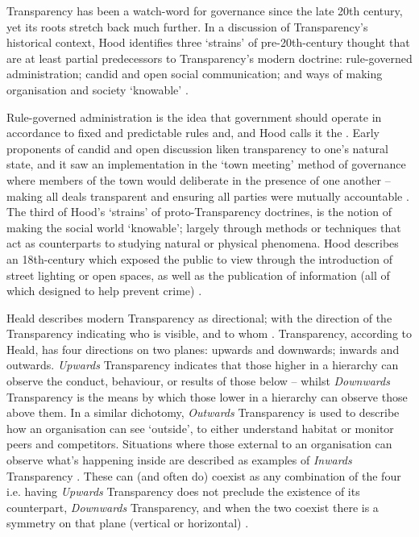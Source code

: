 Transparency has been a watch-word for governance since the late 20th century, yet its roots stretch back much further. In a discussion of Transparency's historical context, Hood identifies three `strains' of pre-20th-century thought that are at least partial predecessors to Transparency's modern doctrine: rule-governed administration; candid and open social communication; and ways of making organisation and society `knowable'  \cite{hood_transparency_2006-1}.

Rule-governed administration is the idea that government should operate in accordance to fixed and predictable rules and, and Hood calls it the  \cite{hood_transparency_2006-1}. Early proponents of candid and open discussion liken transparency to one's natural state, and it saw an implementation in the `town meeting' method of governance where members of the town would deliberate in the presence of one another -- making all deals transparent and ensuring all parties were mutually accountable \cite{hood_transparency_2006-1}. The third of Hood's `strains' of proto-Transparency doctrines, is the notion of making the social world `knowable'; largely through methods or techniques that act as counterparts to studying natural or physical phenomena. Hood describes an 18th-century  which exposed the public to view through the introduction of street lighting or open spaces, as well as the publication of information (all of which designed to help prevent crime) \cite{hood_transparency_2006-1}.


Heald describes modern Transparency as directional; with the direction of the Transparency indicating who is visible, and to whom \cite{heald_varieties_2006}. Transparency, according to Heald, has four directions on two planes: upwards and downwards; inwards and outwards. \textit{Upwards} Transparency indicates that those higher in a hierarchy can observe the conduct, behaviour, or results of those below -- whilst \textit{Downwards} Transparency is the means by which those lower in a hierarchy can observe those above them. In a similar dichotomy, \textit{Outwards} Transparency is used to describe how an organisation can see `outside', to either understand habitat or monitor peers and competitors. Situations where those external to an organisation can observe what's happening inside are described as examples of \textit{Inwards} Transparency \cite{heald_varieties_2006}. These can (and often do) coexist as any combination of the four i.e. having \textit{Upwards} Transparency does not preclude the existence of its counterpart, \textit{Downwards} Transparency, and when the two coexist there is a symmetry on that plane (vertical or horizontal) \cite{heald_varieties_2006}.

